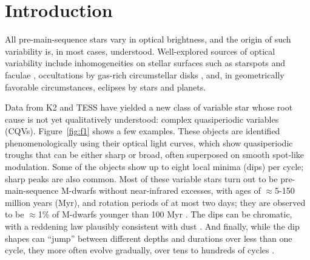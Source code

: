 \documentclass[11pt,twocolumn,tighten]{aastex63}
\begin{document}


\section{Introduction}
\label{sec:intro}


All pre-main-sequence stars vary in optical brightness, and the origin
of such variability is, in most cases, understood.  Well-explored
sources of optical variability include inhomogeneities on stellar
surfaces such as starspots and faculae \citep{2021isma.book.....B},
occultations by gas-rich circumstellar disks
\citep{2017MNRAS.470..202B}, and, in geometrically favorable
circumstances, eclipses by stars and planets.

Data from K2 and TESS have yielded a new class of variable star whose
root cause is not yet qualitatively understood: complex quasiperiodic
variables (CQVs).  Figure~\ref{fig:f1} shows a few examples.  These objects are identified phenomenologically
using their optical light curves, which show quasiperiodic troughs
that can be either sharp or broad, often superposed on smooth
spot-like modulation.  Some of the objects show up to eight local
minima (dips) per cycle; sharp peaks are also common.  Most of these
variable stars turn out to be pre-main-sequence M-dwarfs without
near-infrared excesses, with ages of $\approx$5-150 million years
(Myr), and rotation periods of at most two days; they are observed to
be $\approx$1\% of M-dwarfs younger than 100 Myr
\citep{2016AJ....152..114R,2017AJ....153..152S,2018AJ....155...63S,2019ApJ...876..127Z,2022AJ....163..144G}.
The dips can be chromatic, with a reddening law plausibly consistent
with dust
\citep{2020AJ....160...86B,2022AJ....163..144G,2023MNRAS.518.2921K}.
And finally, while the dip shapes can ``jump'' between different
depths and durations over less than one cycle, they more often evolve
gradually, over tens to hundreds of cycles
\citep[e.g.][]{2017AJ....153..152S,2022ApJ...925...75P,2023ApJ...945..114P}.
\end{document}

